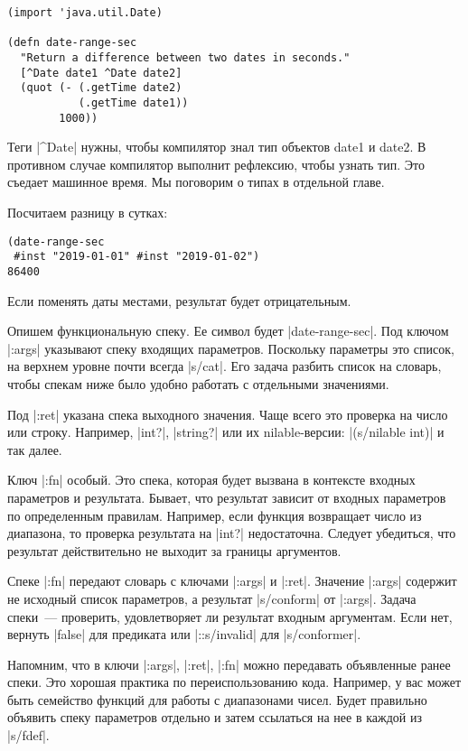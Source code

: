 \begin{verbatim}
(import 'java.util.Date)

(defn date-range-sec
  "Return a difference between two dates in seconds."
  [^Date date1 ^Date date2]
  (quot (- (.getTime date2)
           (.getTime date1))
        1000))
\end{verbatim}

Теги \spverb|^Date| нужны, чтобы компилятор знал тип объектов date1 и date2. В
противном случае компилятор выполнит рефлексию, чтобы узнать тип. Это съедает
машинное время. Мы поговорим о типах в отдельной главе.

Посчитаем разницу в сутках:

\begin{verbatim}
(date-range-sec
 #inst "2019-01-01" #inst "2019-01-02")
86400
\end{verbatim}

Если поменять даты местами, результат будет отрицательным.

Опишем функциональную спеку. Ее символ будет \spverb|date-range-sec|.  Под ключом
\spverb|:args| указывают спеку входящих параметров. Поскольку параметры это список, на
верхнем уровне почти всегда \spverb|s/cat|. Его задача разбить список на словарь, чтобы
спекам ниже было удобно работать с отдельными значениями.

Под \spverb|:ret| указана спека выходного значения. Чаще всего это проверка на число
или строку. Например, \spverb|int?|, \spverb|string?| или их nilable-версии: \spverb|(s/nilable int)|
и так далее.

Ключ \spverb|:fn| особый. Это спека, которая будет вызвана в контексте входных
параметров и результата. Бывает, что результат зависит от входных параметров по
определенным правилам. Например, если функция возвращает число из диапазона, то
проверка результата на \spverb|int?| недостаточна. Следует убедиться, что результат
действительно не выходит за границы аргументов.

Спеке \spverb|:fn| передают словарь с ключами \spverb|:args| и \spverb|:ret|. Значение \spverb|:args|
содержит не исходный список параметров, а результат \spverb|s/conform| от
\spverb|:args|. Задача спеки~--- проверить, удовлетворяет ли результат входным
аргументам. Если нет, вернуть \spverb|false| для предиката или \spverb|::s/invalid| для
\spverb|s/conformer|.

Напомним, что в ключи \spverb|:args|, \spverb|:ret|, \spverb|:fn| можно передавать объявленные ранее
спеки. Это хорошая практика по переиспользованию кода. Например, у вас может
быть семейство функций для работы с диапазонами чисел. Будет правильно объявить
спеку параметров отдельно и затем ссылаться на нее в каждой из \spverb|s/fdef|.

